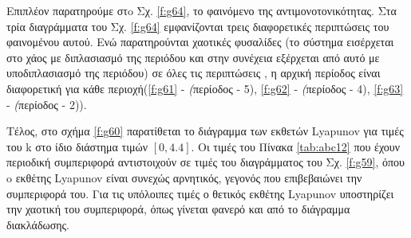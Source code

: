 Επιπλέον παρατηρούμε στo Σχ. \ref{f:g64}, το φαινόμενο της αντιμονοτονικότητας. Στα τρία διαγράμματα του Σχ. \ref{f:g64} εμφανίζονται τρεις διαφορετικές περιπτώσεις του φαινομένου αυτού. Ενώ παρατηρούνται χαοτικές φυσαλίδες (το σύστημα εισέρχεται στο χάος με διπλασιασμό της περιόδου και στην συνέχεια εξέρχεται από αυτό με υποδιπλασιασμό της περιόδου) σε όλες τις περιπτώσεις , η αρχική περίοδος είναι διαφορετική για κάθε περιοχή(\ref{f:g61} - \emph(περίοδος - 5), \ref{f:g62} - \emph(περίοδος - 4), \ref{f:g63} - \emph(περίοδος - 2)). 

Τέλος, στο σχήμα \ref{f:g60} παρατίθεται το διάγραμμα των εκθετών Lyapunov για τιμές του k στο ίδιο διάστημα τιμών $[0, 4.4]$. Οι τιμές του Πίνακα \ref{tab:abc12} που έχουν περιοδική συμπεριφορά αντιστοιχούν σε τιμές του διαγράμματος του Σχ. \ref{f:g59}, όπου o εκθέτης Lyapunov είναι συνεχώς αρνητικός, γεγονός που επιβεβαιώνει την συμπεριφορά του. Για τις υπόλοιπες τιμές ο θετικός εκθέτης Lyapunov υποστηρίζει την χαοτική του συμπεριφορά, όπως γίνεται φανερό και από το διάγραμμα διακλάδωσης.\\\\

